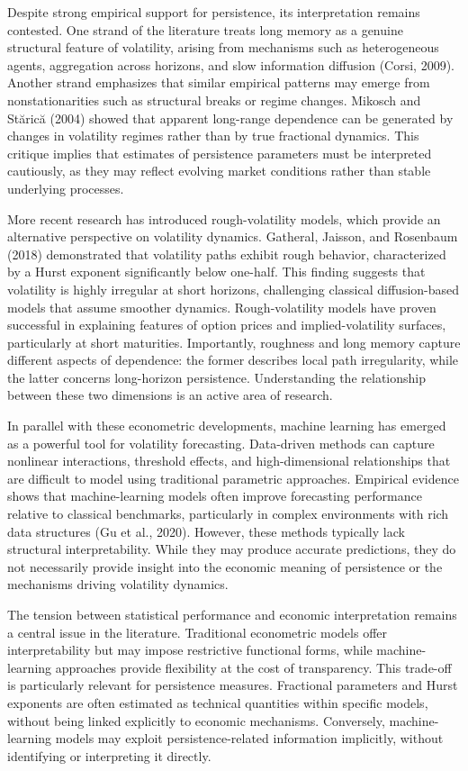 \documentclass[12pt]{article}
\begin{document}
Despite strong empirical support for persistence, its interpretation remains contested. One strand of the literature treats long memory as a genuine structural feature of volatility, arising from mechanisms such as heterogeneous agents, aggregation across horizons, and slow information diffusion (Corsi, 2009). Another strand emphasizes that similar empirical patterns may emerge from nonstationarities such as structural breaks or regime changes. Mikosch and St\u{a}ric\u{a} (2004) showed that apparent long-range dependence can be generated by changes in volatility regimes rather than by true fractional dynamics. This critique implies that estimates of persistence parameters must be interpreted cautiously, as they may reflect evolving market conditions rather than stable underlying processes.

More recent research has introduced rough-volatility models, which provide an alternative perspective on volatility dynamics. Gatheral, Jaisson, and Rosenbaum (2018) demonstrated that volatility paths exhibit rough behavior, characterized by a Hurst exponent significantly below one-half. This finding suggests that volatility is highly irregular at short horizons, challenging classical diffusion-based models that assume smoother dynamics. Rough-volatility models have proven successful in explaining features of option prices and implied-volatility surfaces, particularly at short maturities. Importantly, roughness and long memory capture different aspects of dependence: the former describes local path irregularity, while the latter concerns long-horizon persistence. Understanding the relationship between these two dimensions is an active area of research.

In parallel with these econometric developments, machine learning has emerged as a powerful tool for volatility forecasting. Data-driven methods can capture nonlinear interactions, threshold effects, and high-dimensional relationships that are difficult to model using traditional parametric approaches. Empirical evidence shows that machine-learning models often improve forecasting performance relative to classical benchmarks, particularly in complex environments with rich data structures (Gu et al., 2020). However, these methods typically lack structural interpretability. While they may produce accurate predictions, they do not necessarily provide insight into the economic meaning of persistence or the mechanisms driving volatility dynamics.

The tension between statistical performance and economic interpretation remains a central issue in the literature. Traditional econometric models offer interpretability but may impose restrictive functional forms, while machine-learning approaches provide flexibility at the cost of transparency. This trade-off is particularly relevant for persistence measures. Fractional parameters and Hurst exponents are often estimated as technical quantities within specific models, without being linked explicitly to economic mechanisms. Conversely, machine-learning models may exploit persistence-related information implicitly, without identifying or interpreting it directly.
\end{document}
